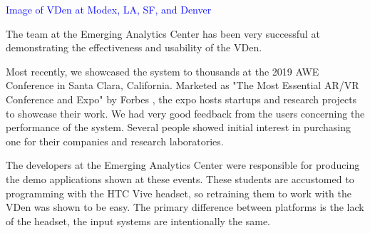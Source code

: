 \label{chapter:conclusionChapter}

\begin{center}
	\textcolor{blue}{Image of VDen at Modex, LA, SF, and Denver}
\end{center}

The team at the Emerging Analytics Center has been very successful at demonstrating the effectiveness and usability of the VDen.

Most recently, we showcased the system to thousands at the 2019 AWE Conference in Santa Clara, California. Marketed as "The Most Essential AR/VR Conference and Expo" by Forbes \cite{aweHomepage}, the expo hosts startups and research projects to showcase their work. We had very good feedback from the users concerning the performance of the system. Several people showed initial interest in purchasing one for their companies and research laboratories. 

The developers at the Emerging Analytics Center were responsible for producing the demo applications shown at these events. These students are accustomed to programming with the HTC Vive headset, so retraining them to work with the VDen was shown to be easy. The primary difference between platforms is the lack of the headset, the input systems are intentionally the same.



\clearpage

